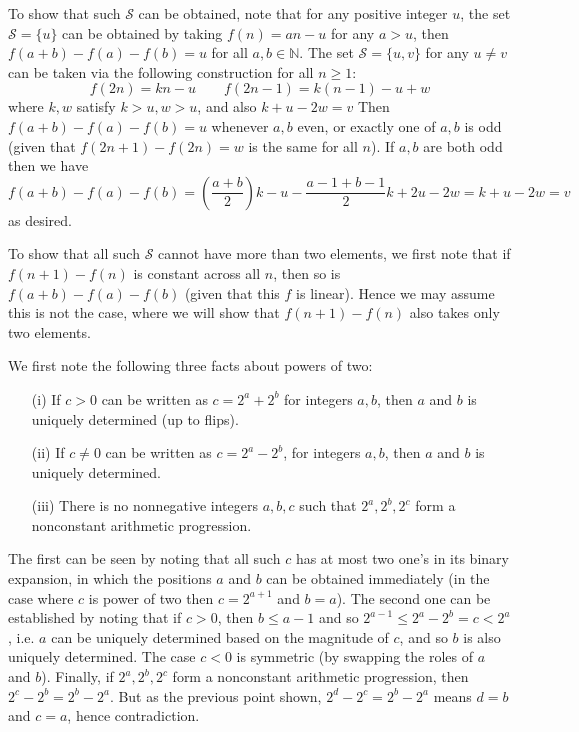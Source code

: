 \documentclass[11pt,a4paper]{article}
\begin{document}
\begin{enumerate}
		To show that such $\mathcal{S}$ can be obtained, 
		note that for any positive integer $u$, 
		the set $\mathcal{S}=\{u\}$ can be obtained by taking 
		$f(n) = an - u$ for any $a > u$, 
		then $f(a+b)-f(a)-f(b)=u$ for all $a, b\in\mathbb{N}$. 
		The set $\mathcal{S}=\{u, v\}$ for any $u\neq v$ can be taken via the following construction for all $n\ge 1$: 
		\[
		f(2n) = kn - u\qquad 
		f(2n - 1) = k(n-1)-u+w
		\]
		where $k, w$ satisfy $k > u, w > u$, 
		and also $k+u-2w=v$
		Then $f(a+b)-f(a)-f(b)=u$ whenever $a, b$ even, 
		or exactly one of $a, b$ is odd 
		(given that $f(2n+1)-f(2n)=w$ is the same for all $n$). 
		If $a, b$ are both odd then we have 
		\[
		f(a+b)-f(a)-f(b)
		= (\frac{a+b}{2})k - u
		-\frac{a-1+b-1}{2}k+2u-2w
		=k+u-2w=v
		\]
		as desired. 
		
		To show that all such $\mathcal{S}$ cannot have more than two elements, 
		we first note that if $f(n+1)-f(n)$ is constant across all $n$, 
		then so is $f(a+b)-f(a)-f(b)$ (given that this $f$ is linear). 
		Hence we may assume this is not the case, 
		where we will show that $f(n+1)-f(n)$ also takes only two elements. 
		
		We first note the following three facts about powers of two: 
		\begin{itemize}
			\item [(i)] 
			If $c > 0$ can be written as $c = 2^a+2^b$ for integers $a, b$, 
			then $a$ and $b$ is uniquely determined (up to flips). 
			
			\item [(ii)] 
			If $c\neq 0$ can be written as $c = 2^a-2^b$, for integers $a, b$, then $a$ and $b$ is uniquely determined. 
			
			\item [(iii)] 
			There is no nonnegative integers $a, b, c$ such that $2^a, 2^b, 2^c$ form a nonconstant arithmetic progression. 
		\end{itemize}
		
		The first can be seen by noting that all such $c$ has at most two one's in its binary expansion, 
		in which the positions $a$ and $b$ can be obtained immediately 
		(in the case where $c$ is power of two then $c=2^{a+1}$ and $b=a$). 
		The second one can be established by noting that if $c>0$, 
		then $b\le a - 1$ and so $2^{a-1}\le 2^{a}-2^b = c<2^a$, 
		i.e. 
		$a$ can be uniquely determined based on the magnitude of $c$, 
		and so $b$ is also uniquely determined. 
		The case $c<0$ is symmetric (by swapping the roles of $a$ and $b$). 
		Finally, 
		if $2^a, 2^b, 2^c$ form a nonconstant arithmetic progression, 
		then $2^c-2^b=2^b-2^a$. 
		But as the previous point shown, $2^d-2^c=2^b-2^a$ means $d=b$ and $c=a$, hence contradiction. 
		

\end{enumerate}
\end{document}
